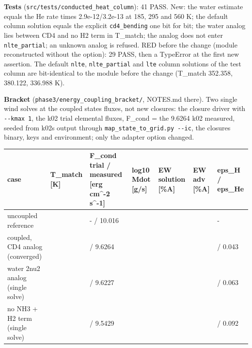 \documentclass[english,a4paper]{my_memo}
\begin{document}
\textbf{Tests} (\texttt{src/tests/conducted\_heat\_column}): 41 PASS. New: the water
estimate equals the He rate times 2.9e-12/3.2e-13 at 185, 295 and 560 K; the
default column solution equals the explicit \texttt{cd4\_bending} one bit for bit;
the water analog lies between CD4 and no H2 term in T\_match; the analog does
not enter \texttt{nlte\_partial}; an unknown analog is refused. RED before the change
(module reconstructed without the option): 29 PASS, then a TypeError at the
first new assertion. The default \texttt{nlte}, \texttt{nlte\_partial} and \texttt{lte} column
solutions of the test column are bit-identical to the module before the
change (T\_match 352.358, 380.122, 336.988 K).

\textbf{Bracket} (\texttt{phase3/energy\_coupling\_bracket/}, NOTES.md there). Two single
wind solves at the coupled state\textquotesingle s fluxes, not new closures: the closure
driver with \texttt{-\/-kmax\ 1}, the k02 trial elemental fluxes, F\_cond = the 9.6264
k02 measured, seeded from k02\textquotesingle s output through \texttt{map\_state\_to\_grid.py\ -\/-ic},
the closure\textquotesingle s binary, keys and environment; only the adapter option changed.

{\def\LTcaptype{none} %
{\small
\begin{longtable}[]{@{}>{\raggedright\arraybackslash}p{\dimexpr(\linewidth-14\tabcolsep)/7\relax}>{\raggedright\arraybackslash}p{\dimexpr(\linewidth-14\tabcolsep)/7\relax}>{\raggedright\arraybackslash}p{\dimexpr(\linewidth-14\tabcolsep)/7\relax}>{\raggedright\arraybackslash}p{\dimexpr(\linewidth-14\tabcolsep)/7\relax}>{\raggedright\arraybackslash}p{\dimexpr(\linewidth-14\tabcolsep)/7\relax}>{\raggedright\arraybackslash}p{\dimexpr(\linewidth-14\tabcolsep)/7\relax}>{\raggedright\arraybackslash}p{\dimexpr(\linewidth-14\tabcolsep)/7\relax}@{}}
\toprule\noalign{}
case & T\_match {[}K{]} & F\_cond trial / measured {[}erg cm\^{}-2 s\^{}-1{]} & log10 Mdot {[}g/s{]} & EW solution {[}\%A{]} & EW adv {[}\%A{]} & eps\_H / eps\_He \\
\midrule\noalign{}
\endhead
\bottomrule\noalign{}
\endlastfoot
uncoupled reference & 185.0 & - / 10.016 & 7.8029 & 0.5793 & 0.5643 & - \\
coupled, CD4 analog (converged) & 349.88 & 9.7267 / 9.6264 & 7.8854 & 0.7255 & 0.7114 & 0.015 / 0.043 \\
water 2nu2 analog (single solve) & 358.01 & 9.6264 / 9.6227 & 7.8928 & 0.7401 & 0.7262 & 0.023 / 0.063 \\
no NH3 + H2 term (single solve) & 375.29 & 9.6264 / 9.5429 & 7.9041 & 0.7629 & 0.7491 & 0.035 / 0.092 \\
\end{longtable}
}
}
\end{document}
